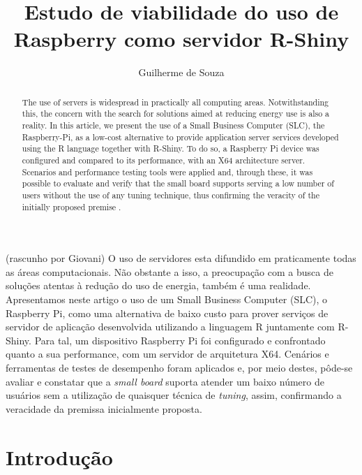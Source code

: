 \documentclass[12pt,english,brazil]{article}
\title{Estudo de viabilidade do uso de Raspberry como servidor R-Shiny}
\author{Guilherme de Souza\inst{1}}
\begin{document}
 

\maketitle
    
\en
\begin{abstract}
The use of servers is widespread in practically all computing areas. Notwithstanding this, the concern with the search for solutions aimed at reducing energy use is also a reality. In this article, we present the use of a Small Business Computer (SLC), the Raspberry-Pi, as a low-cost alternative to provide application server services developed using the R language together with R-Shiny. To do so, a Raspberry Pi device was configured and compared to its performance, with an X64 architecture server. Scenarios and performance testing tools were applied and, through these, it was possible to evaluate and verify that the small board supports serving a low number of users without the use of any tuning technique, thus confirming the veracity of the initially proposed premise .

\end{abstract}

\br
\begin{resumo} (rascunho por Giovani)
O uso de servidores esta difundido em praticamente todas as áreas computacionais. Não obstante a isso, a preocupação com a busca de soluções atentas à redução do uso de energia, também é uma realidade.  Apresentamos neste artigo o uso de um Small Business Computer (SLC), o Raspberry Pi, como uma alternativa de baixo custo para prover serviços de servidor de aplicação desenvolvida utilizando a linguagem R juntamente com R-Shiny. Para tal, um dispositivo Raspberry Pi foi configurado e confrontado quanto a sua performance, com um servidor de arquitetura X64. Cenários e ferramentas de testes de desempenho foram aplicados e, por meio destes, pôde-se avaliar e constatar que a \emph{small board} suporta atender um baixo número de usuários sem a utilização de quaisquer técnica de \emph{tuning}, assim, confirmando a veracidade da premissa inicialmente proposta.


\end{resumo}



\section{Introdução}
\end{document}
